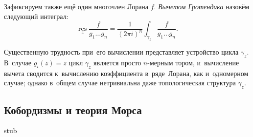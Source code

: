 \documentclass[a4paper,oneside]{article}
\begin{document}
Зафиксируем также ещё один многочлен Лорана $f$. \textit{Вычетом Гротендика} назовём следующий интеграл:
$$
  \operatorname*{res}\limits_{z} \frac{f}{g_1 \ldots g_n} = \frac{1}{(2 \pi i)^n} \int_{\gamma_z} \frac{f}{g_1 \ldots g_n}.
$$

Существенную трудность при~его вычислении представляет устройство цикла $\gamma_z$.
В~случае $g_i(z) = z$ цикл $\gamma_z$ является просто $n$-мерным тором, и~вычисление вычета
сводится к~вычислению коэффициента в~ряде~Лорана, как и~одномерном случае; однако в~общем случае
нетривиальна даже топологическая структура $\gamma_z$.

\subsection{Кобордизмы и теория Морса}

stub

\pagebreak

\end{document}
